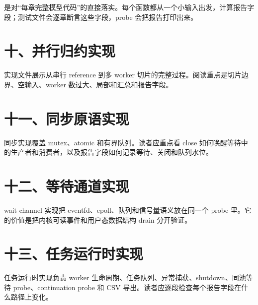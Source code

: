  是对“每章完整模型代码”的直接落实。每个函数都从一个小输入出发，计算报告字段；测试文件会逐章断言这些字段，probe 会把报告打印出来。



\section{十、并行归约实现}

实现文件展示从串行 reference 到多 worker 切片的完整过程。阅读重点是切片边界、空输入、worker 数过大、局部和汇总和报告字段。



\section{十一、同步原语实现}

同步实现覆盖 mutex、atomic 和有界队列。读者应重点看 close 如何唤醒等待中的生产者和消费者，以及报告字段如何记录等待、关闭和队列水位。



\section{十二、等待通道实现}

wait channel 实现把 eventfd、epoll、队列和信号量语义放在同一个 probe 里。它的价值是把内核可读事件和用户态数据结构 drain 分开验证。



\section{十三、任务运行时实现}

任务运行时实现负责 worker 生命周期、任务队列、异常捕获、shutdown、同池等待 probe、continuation probe 和 CSV 导出。读者应逐段检查每个报告字段在什么路径上变化。




